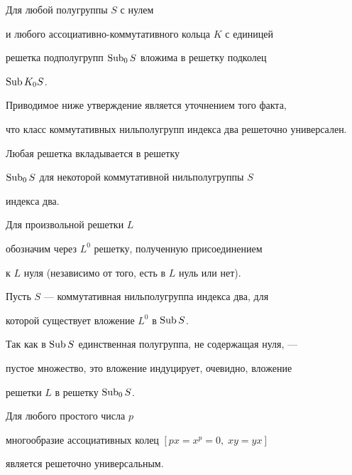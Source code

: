 \begin{lemm} Для любой полугруппы $S$ с нулем


и любого ассоциативно-коммутативного кольца $K$ с единицей


решетка подполугрупп $\operatorname{Sub}_0 S$ вложима в решетку подколец


$\operatorname{Sub} K_0 S$.


\end{lemm}





Приводимое ниже утверждение является уточнением того факта,


что класс коммутативных нильполугрупп индекса два решеточно универсален.





\begin{lemm} Любая решетка вкладывается в решетку


$\operatorname{Sub}_0 S$ для некоторой коммутативной нильполугруппы $S$


индекса два.


\end{lemm}





\begin{pf} Для произвольной решетки $L$


обозначим через $L^0$ решетку, полученную присоединением


к $L$ нуля (независимо от того, есть в $L$ нуль или нет).


Пусть $S$ --- коммутативная нильполугруппа индекса два, для


которой существует вложение $L^{0}$ в $\operatorname{Sub} S$.


Так как в $\operatorname{Sub} S$ единственная полугруппа, не содержащая нуля, ---


пустое множество, это вложение индуцирует, очевидно, вложение


решетки $L$ в решетку $\operatorname{Sub}_0 S$.


\end{pf}





\begin{lemm} Для любого простого числа $p$


многообразие ассоциативных колец $[px = x^p = 0,\; xy = yx]$


является решеточно универсальным.


\end{lemm}





